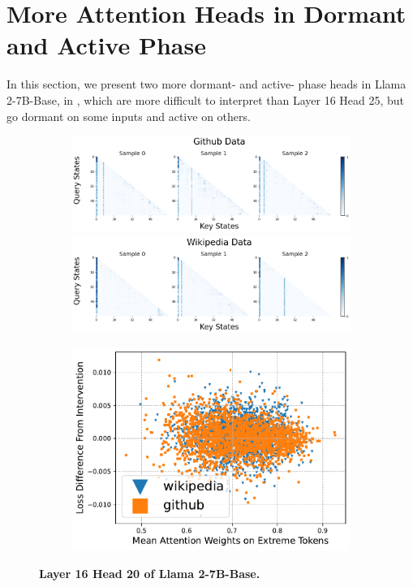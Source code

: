 \section{More Attention Heads in Dormant and Active Phase}\label{sec:more_heads}

In this section, we present two more dormant- and active- phase heads in Llama 2-7B-Base, in , which are more difficult to interpret than Layer 16 Head 25, but go dormant on some inputs and active on others. 

\begin{figure}[h]
    \centering
    \begin{subfigure}[t]{0.475\textwidth}
        \centering 
        \caption{}
        \includegraphics[width=\linewidth]{Figures/L16H20/github.png}
        \includegraphics[width=\linewidth]{Figures/L16H20/wikipedia.png}
    \end{subfigure}
    \hfill
    \begin{subfigure}[t]{0.475\textwidth}
        \centering 
        \caption{}
        \includegraphics[width=\linewidth]{Figures/L16H20/intervention.pdf}
    \end{subfigure}
    \caption{\small \textbf{Layer 16 Head 20 of Llama 2-7B-Base.}}
    \label{fig:llama_l16h20}
\end{figure}

